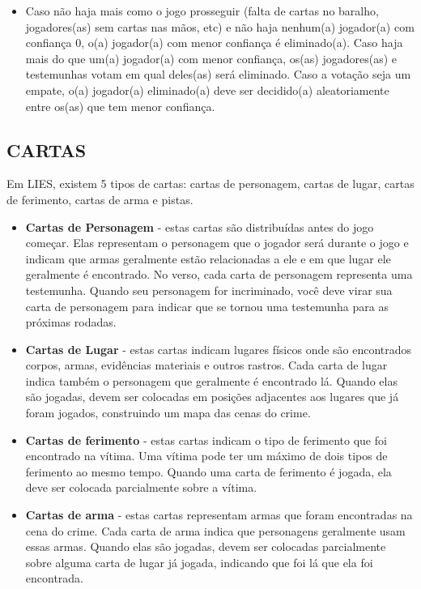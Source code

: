 \documentclass[a4paper, 11pt]{article}
\begin{document}
	\begin{itemize}
		\item Caso não haja mais como o jogo prosseguir (falta de cartas no baralho, jogadores(as) sem cartas nas mãos, etc) e não haja nenhum(a) jogador(a) com confiança 0, o(a) jogador(a) com menor confiança é eliminado(a). Caso haja mais do que um(a) jogador(a) com menor confiança, os(as) jogadores(as) e testemunhas votam em qual deles(as) será eliminado. Caso a votação seja um empate, o(a) jogador(a) eliminado(a) deve ser decidido(a) aleatoriamente  entre os(as) que tem menor confiança.
	\end{itemize}

\subsection*{CARTAS}


	Em LIES, existem 5 tipos de cartas: cartas de personagem, cartas de lugar, cartas de ferimento, cartas de arma e pistas.

	\begin{itemize}
		\item \textbf{Cartas de Personagem} - estas cartas são distribuídas antes do jogo começar. Elas representam o personagem que o jogador será durante o jogo e indicam que armas geralmente estão relacionadas a ele e em que lugar ele geralmente é encontrado. No verso, cada carta de personagem representa uma testemunha. Quando seu personagem for incriminado, você deve virar sua carta de personagem para indicar que se tornou uma testemunha para as próximas rodadas.

		\item \textbf{Cartas de Lugar} - estas cartas indicam lugares físicos onde são encontrados corpos, armas, evidências materiais e outros rastros. Cada carta de lugar indica também o personagem que geralmente é encontrado lá. Quando elas são jogadas, devem ser colocadas em posições adjacentes aos lugares que já foram jogados, construindo um mapa das cenas do crime.

		\item \textbf{Cartas de ferimento} - estas cartas indicam o tipo de ferimento que foi encontrado na vítima. Uma vítima pode ter um máximo de dois tipos de ferimento ao mesmo tempo. Quando uma carta de ferimento é jogada, ela deve ser colocada parcialmente sobre a vítima.

		\item \textbf{Cartas de arma} - estas cartas representam armas que foram encontradas na cena do crime. Cada carta de arma indica que personagens geralmente usam essas armas. Quando elas são jogadas, devem ser colocadas parcialmente sobre alguma carta de lugar já jogada, indicando que foi lá que ela foi encontrada.
	\end{itemize}
\end{document}
